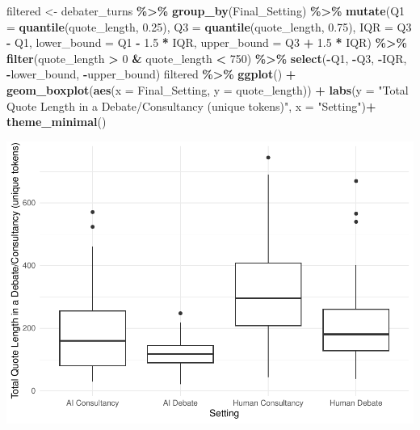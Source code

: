 \documentclass[
]{article}
\newenvironment{Shaded}{\begin{snugshade}}{\end{snugshade}}
\newcommand{\AttributeTok}[1]{\textcolor[rgb]{0.13,0.29,0.53}{#1}}
\newcommand{\DecValTok}[1]{\textcolor[rgb]{0.00,0.00,0.81}{#1}}
\newcommand{\FloatTok}[1]{\textcolor[rgb]{0.00,0.00,0.81}{#1}}
\newcommand{\FunctionTok}[1]{\textcolor[rgb]{0.13,0.29,0.53}{\textbf{#1}}}
\newcommand{\NormalTok}[1]{#1}
\newcommand{\OtherTok}[1]{\textcolor[rgb]{0.56,0.35,0.01}{#1}}
\newcommand{\SpecialCharTok}[1]{\textcolor[rgb]{0.81,0.36,0.00}{\textbf{#1}}}
\newcommand{\StringTok}[1]{\textcolor[rgb]{0.31,0.60,0.02}{#1}}
\begin{document}
\begin{Shaded}
\begin{Highlighting}[]
\NormalTok{filtered }\OtherTok{\textless{}{-}}\NormalTok{ debater\_turns }\SpecialCharTok{\%\textgreater{}\%}
  \FunctionTok{group\_by}\NormalTok{(Final\_Setting) }\SpecialCharTok{\%\textgreater{}\%}
  \FunctionTok{mutate}\NormalTok{(}\AttributeTok{Q1 =} \FunctionTok{quantile}\NormalTok{(quote\_length, }\FloatTok{0.25}\NormalTok{),}
         \AttributeTok{Q3 =} \FunctionTok{quantile}\NormalTok{(quote\_length, }\FloatTok{0.75}\NormalTok{),}
         \AttributeTok{IQR =}\NormalTok{ Q3 }\SpecialCharTok{{-}}\NormalTok{ Q1,}
         \AttributeTok{lower\_bound =}\NormalTok{ Q1 }\SpecialCharTok{{-}} \FloatTok{1.5} \SpecialCharTok{*}\NormalTok{ IQR,}
         \AttributeTok{upper\_bound =}\NormalTok{ Q3 }\SpecialCharTok{+} \FloatTok{1.5} \SpecialCharTok{*}\NormalTok{ IQR) }\SpecialCharTok{\%\textgreater{}\%}
  \FunctionTok{filter}\NormalTok{(quote\_length }\SpecialCharTok{\textgreater{}} \DecValTok{0} \SpecialCharTok{\&}\NormalTok{ quote\_length }\SpecialCharTok{\textless{}} \DecValTok{750}\NormalTok{) }\SpecialCharTok{\%\textgreater{}\%}
  \FunctionTok{select}\NormalTok{(}\SpecialCharTok{{-}}\NormalTok{Q1, }\SpecialCharTok{{-}}\NormalTok{Q3, }\SpecialCharTok{{-}}\NormalTok{IQR, }\SpecialCharTok{{-}}\NormalTok{lower\_bound, }\SpecialCharTok{{-}}\NormalTok{upper\_bound) }
\NormalTok{filtered }\SpecialCharTok{\%\textgreater{}\%}
  \FunctionTok{ggplot}\NormalTok{() }\SpecialCharTok{+}
  \FunctionTok{geom\_boxplot}\NormalTok{(}\FunctionTok{aes}\NormalTok{(}\AttributeTok{x =}\NormalTok{ Final\_Setting, }\AttributeTok{y =}\NormalTok{ quote\_length)) }\SpecialCharTok{+}
  \FunctionTok{labs}\NormalTok{(}\AttributeTok{y =} \StringTok{"Total Quote Length in a Debate/Consultancy (unique tokens)"}\NormalTok{, }\AttributeTok{x =} \StringTok{"Setting"}\NormalTok{)}\SpecialCharTok{+}
  \FunctionTok{theme\_minimal}\NormalTok{()}
\end{Highlighting}
\end{Shaded}

\includegraphics[width=1\linewidth]{debate-2309_files/figure-latex/quote_length graph-3}
\end{document}

